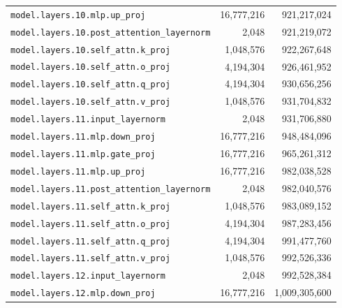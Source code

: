 \documentclass[10pt,a4paper]{article}
\theoremstyle{definition}
\begin{document}
\begin{appendices}
\begin{longtable}{p{9.5cm}rr}
\texttt{model.\allowbreak{}layers.\allowbreak{}10.\allowbreak{}mlp.\allowbreak{}up\_proj} & 16,777,216 & 921,217,024 \\
\texttt{model.\allowbreak{}layers.\allowbreak{}10.\allowbreak{}post\_attention\_layernorm} & 2,048 & 921,219,072 \\
\texttt{model.\allowbreak{}layers.\allowbreak{}10.\allowbreak{}self\_attn.\allowbreak{}k\_proj} & 1,048,576 & 922,267,648 \\
\texttt{model.\allowbreak{}layers.\allowbreak{}10.\allowbreak{}self\_attn.\allowbreak{}o\_proj} & 4,194,304 & 926,461,952 \\
\texttt{model.\allowbreak{}layers.\allowbreak{}10.\allowbreak{}self\_attn.\allowbreak{}q\_proj} & 4,194,304 & 930,656,256 \\
\texttt{model.\allowbreak{}layers.\allowbreak{}10.\allowbreak{}self\_attn.\allowbreak{}v\_proj} & 1,048,576 & 931,704,832 \\
\texttt{model.\allowbreak{}layers.\allowbreak{}11.\allowbreak{}input\_layernorm} & 2,048 & 931,706,880 \\
\texttt{model.\allowbreak{}layers.\allowbreak{}11.\allowbreak{}mlp.\allowbreak{}down\_proj} & 16,777,216 & 948,484,096 \\
\texttt{model.\allowbreak{}layers.\allowbreak{}11.\allowbreak{}mlp.\allowbreak{}gate\_proj} & 16,777,216 & 965,261,312 \\
\texttt{model.\allowbreak{}layers.\allowbreak{}11.\allowbreak{}mlp.\allowbreak{}up\_proj} & 16,777,216 & 982,038,528 \\
\texttt{model.\allowbreak{}layers.\allowbreak{}11.\allowbreak{}post\_attention\_layernorm} & 2,048 & 982,040,576 \\
\texttt{model.\allowbreak{}layers.\allowbreak{}11.\allowbreak{}self\_attn.\allowbreak{}k\_proj} & 1,048,576 & 983,089,152 \\
\texttt{model.\allowbreak{}layers.\allowbreak{}11.\allowbreak{}self\_attn.\allowbreak{}o\_proj} & 4,194,304 & 987,283,456 \\
\texttt{model.\allowbreak{}layers.\allowbreak{}11.\allowbreak{}self\_attn.\allowbreak{}q\_proj} & 4,194,304 & 991,477,760 \\
\texttt{model.\allowbreak{}layers.\allowbreak{}11.\allowbreak{}self\_attn.\allowbreak{}v\_proj} & 1,048,576 & 992,526,336 \\
\texttt{model.\allowbreak{}layers.\allowbreak{}12.\allowbreak{}input\_layernorm} & 2,048 & 992,528,384 \\
\texttt{model.\allowbreak{}layers.\allowbreak{}12.\allowbreak{}mlp.\allowbreak{}down\_proj} & 16,777,216 & 1,009,305,600 \\

\end{longtable}
\end{appendices}
\end{document}
